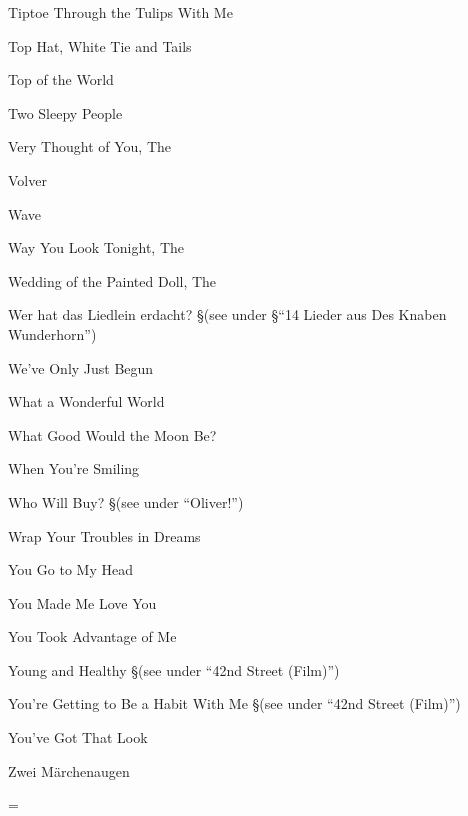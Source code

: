 \N Tiptoe Through the Tulips With Me

\N Top Hat, White Tie and Tails

\N Top of the World

\N Two Sleepy People

\N Very Thought of You, The

\N Volver

\N Wave

\N Way You Look Tonight, The

\N Wedding of the Painted Doll, The

\N Wer hat das Liedlein erdacht?
\nobreak
\S (see under
\S ``14 Lieder aus Des Knaben Wunderhorn'')

\N We've Only Just Begun

\N What a Wonderful World

\N What Good Would the Moon Be?

\N When You're Smiling

\N Who Will Buy?
\nobreak
\S (see under ``Oliver!'')

\N Wrap Your Troubles in Dreams

\N You Go to My Head

\N You Made Me Love You

\N You Took Advantage of Me

\N Young and Healthy
\nobreak
\S (see under ``42nd Street (Film)'')

\N You're Getting to Be a Habit With Me
\nobreak
\S (see under ``42nd Street (Film)'')

\N You've Got That Look

\N Zwei M{\"a}rchenaugen

\singlecolumn
\vfil\eject
\ifseparate
\else
\pagecnt=\pageno
\fi
\endinput

